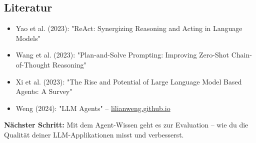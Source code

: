 \subsection{Literatur}

\begin{itemize}[leftmargin=*]
    \item Yao et al. (2023): "ReAct: Synergizing Reasoning and Acting in Language Models"
    \item Wang et al. (2023): "Plan-and-Solve Prompting: Improving Zero-Shot Chain-of-Thought Reasoning"
    \item Xi et al. (2023): "The Rise and Potential of Large Language Model Based Agents: A Survey"
    \item Weng (2024): "LLM Agents" -- \href{https://lilianweng.github.io/posts/2023-06-23-agent/}{lilianweng.github.io}
\end{itemize}

\textbf{Nächster Schritt:} Mit dem Agent-Wissen geht es zur Evaluation -- wie du die Qualität deiner LLM-Applikationen misst und verbesserst.
